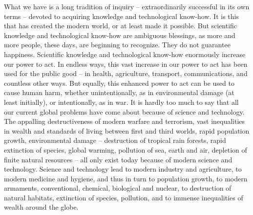 \documentclass[12pt]{article}
\begin{document}
\begin{flushleft}
\hspace{10pt}What we have is a long tradition of inquiry – extraordinarily successful in its own terms – devoted to acquiring knowledge and technological know-how. It is this that has created the modern world, or at least made it possible. But scientific knowledge and technological know-how are ambiguous blessings, as more and more people, these days, are beginning to recognize. They do not guarantee happiness. Scientific knowledge and technological know-how enormously increase our power to act. In endless ways, this vast increase in our power to act has been used for the public good – in health, agriculture, transport, communications, and countless other ways. But equally, this enhanced power to act can be used to cause human harm, whether unintentionally, as in environmental damage (at least initially), or intentionally, as in war. It is hardly too much to say that all our current global problems have come about because of science and technology. The appalling destructiveness of modern warfare and terrorism, vast inequalities in wealth and standards of living between first and third worlds, rapid population growth, environmental damage – destruction of tropical rain forests, rapid extinction of species, global warming, pollution of sea, earth and air, depletion of finite natural resources – all only exist today because of modern science and technology. Science and technology lead to modern industry and agriculture, to modern medicine and hygiene, and thus in turn to population growth, to modern armaments, conventional, chemical, biological and nuclear, to destruction of natural habitats, extinction of species, pollution, and to immense inequalities of wealth around the globe.
\end{flushleft}
\end{document}
